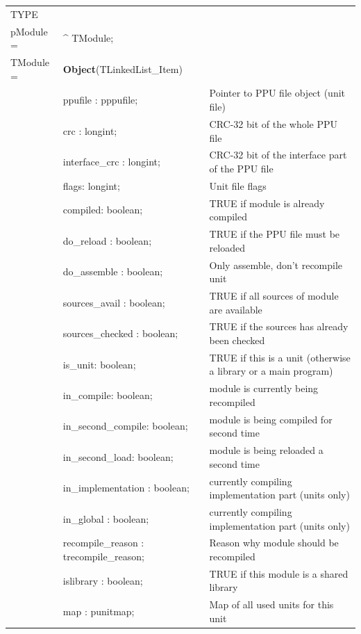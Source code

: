 \documentclass [12pt]{article}
\begin{document}
\begin{longtable}{|l@{\extracolsep{\fill}}lp{7cm}|}
\hline
\endhead
\hline
\endfoot
\textsf{TYPE}& & \\
\xspace pModule = & \^{}  TModule; & \\
\xspace \textsf{TModule} = & \textbf{Object}(TLinkedList\_Item) & \\
&\textsf{ppufile : pppufile;}& Pointer to PPU file object (unit file) \\
&\textsf{crc : longint;}& CRC-32 bit of the whole PPU file \\
&\textsf{interface{\_}crc : longint;}& CRC-32 bit of the interface part of the PPU file \\
&\textsf{flags: longint;}& Unit file flags \\
&\textsf{compiled: boolean;}& TRUE if module is already compiled \\
&\textsf{do{\_}reload : boolean;}	& TRUE if the PPU file must be reloaded \\
&\textsf{do{\_}assemble : boolean;}	& Only assemble, don't recompile unit \\
&\textsf{sources{\_}avail : boolean;}	& TRUE if all sources of module are available \\
&\textsf{sources{\_}checked : boolean;}	& TRUE if the sources has already been checked \\
&\textsf{is{\_}unit: boolean;}		& TRUE if this is a unit (otherwise a library or a main program) \\
&\textsf{in{\_}compile: boolean;}	& module is currently being recompiled \\
&\textsf{in{\_}second{\_}compile: boolean;}& module is being compiled for second time \\
&\textsf{in{\_}second{\_}load: boolean;}	& module is being reloaded a second time \\
&\textsf{in{\_}implementation : boolean;}& currently compiling implementation part (units only) \\
&\textsf{in{\_}global : boolean;}	& currently compiling implementation part (units only) \\
&\textsf{recompile{\_}reason : trecompile{\_}reason;}& Reason why module should be recompiled \\
&\textsf{islibrary : boolean;}& 		TRUE if this module is a shared library \\
&\textsf{map : punitmap;}		& Map of all used units for this unit \\

\end{longtable}
\end{document}

